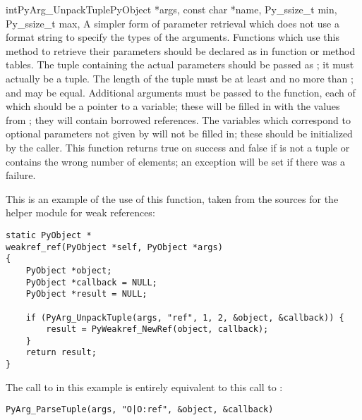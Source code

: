 \begin{cfuncdesc}{int}{PyArg_UnpackTuple}{PyObject *args, const char *name,
                                          Py_ssize_t min, Py_ssize_t max, \moreargs}
  A simpler form of parameter retrieval which does not use a format
  string to specify the types of the arguments.  Functions which use
  this method to retrieve their parameters should be declared as
   in function or method tables.  The tuple
  containing the actual parameters should be passed as ; it
  must actually be a tuple.  The length of the tuple must be at least
   and no more than ;  and  may be
  equal.  Additional arguments must be passed to the function, each of
  which should be a pointer to a  variable; these
  will be filled in with the values from ; they will contain
  borrowed references.  The variables which correspond to optional
  parameters not given by  will not be filled in; these
  should be initialized by the caller.
  This function returns true on success and false if  is not
  a tuple or contains the wrong number of elements; an exception will
  be set if there was a failure.

  This is an example of the use of this function, taken from the
  sources for the  helper module for weak references:

\begin{verbatim}
static PyObject *
weakref_ref(PyObject *self, PyObject *args)
{
    PyObject *object;
    PyObject *callback = NULL;
    PyObject *result = NULL;

    if (PyArg_UnpackTuple(args, "ref", 1, 2, &object, &callback)) {
        result = PyWeakref_NewRef(object, callback);
    }
    return result;
}
\end{verbatim}

  The call to  in this example is
  entirely equivalent to this call to :

\begin{verbatim}
PyArg_ParseTuple(args, "O|O:ref", &object, &callback)
\end{verbatim}

\end{cfuncdesc}

